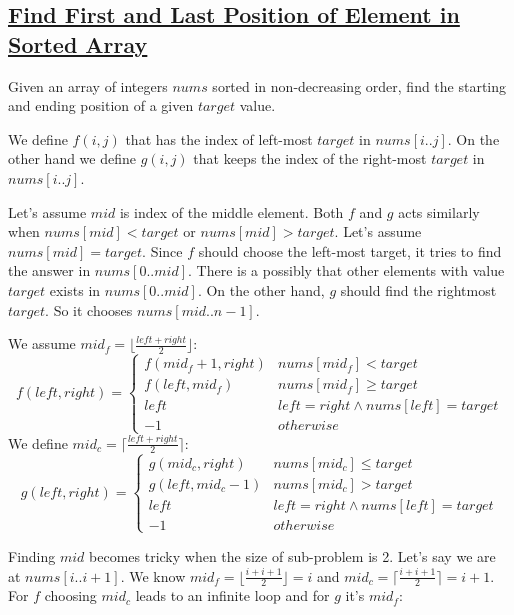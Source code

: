 \documentclass{book}
\begin{document}
	\subsection{\href{https://leetcode.com/problems/find-first-and-last-position-of-element-in-sorted-array/}{Find First and Last Position of Element in Sorted Array}}
	Given an array of integers $nums$ sorted in non-decreasing order, find the starting and ending position of a given $target$ value.
	\par We define $f(i, j)$ that has the index of left-most $target$ in $nums[i..j]$. On the other hand we define $g(i, j)$ that keeps the index of the right-most $target$ in $nums[i..j]$. 
	\par Let's assume $mid$ is index of the middle element. Both $f$ and $g$ acts similarly when $nums[mid] < target$ or $nums[mid] > target$. Let's assume $nums[mid] = target$. Since $f$ should choose the left-most target, it tries to find the answer in $nums[0..mid]$. There is a possibly that other elements with value $target$ exists in $nums[0..mid]$. On the other hand, $g$ should find the rightmost $target$. So it chooses $nums[mid..n - 1]$.
	\par We assume $mid_f = \lfloor \frac{left + right}{2} \rfloor$:
	\begin{equation*}
		f(left, right) = \begin{cases}
			f(mid_f + 1, right) & nums[mid_f] < target \\
			f(left, mid_f) & nums[mid_f] \ge target \\
			left & left = right \land nums[left] = target \\
			-1 & otherwise
		\end{cases}
	\end{equation*}
	We define $mid_c = \lceil \frac{left + right}{2} \rceil$:
	\begin{equation*}
		g(left, right) = \begin{cases}
			g(mid_c, right) & nums[mid_c] \le target \\
			g(left, mid_c - 1) & nums[mid_c] > target \\
			left & left = right \land nums[left] = target \\
			-1 & otherwise
		\end{cases}
	\end{equation*}
	\par Finding $mid$ becomes tricky when the size of sub-problem is 2. Let's say we are at $nums[i..i + 1]$. We know $mid_f = \lfloor \frac{i + i + 1}{2} \rfloor = i$ and $mid_c = \lceil \frac{i + i + 1}{2} \rceil = i + 1$. For $f$ choosing $mid_c$ leads to an infinite loop and for $g$ it's $mid_f$:
\end{document}
